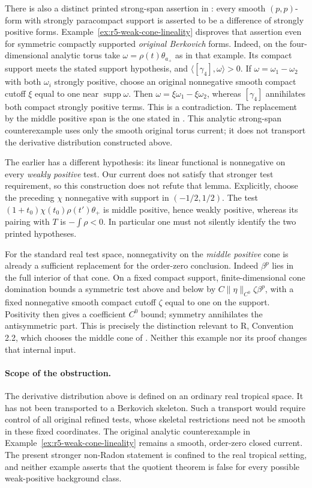 \documentclass[11pt,a4paper]{article}
\numberwithin{equation}{section}
\theoremstyle{definition}
\theoremstyle{remark}
\begin{document}
There is also a distinct printed strong-span assertion in
\cite[Lemma 5.3.3, p.~81]{CLD12}: every smooth $(p,p)$-form
with strongly paracompact support is asserted to be a difference
of strongly positive forms.  Example~\ref{ex:r5-weak-cone-lineality}
disproves that assertion even for symmetric compactly supported
\emph{original Berkovich} forms.  Indeed, on the four-dimensional
analytic torus take $\omega=\rho(t)\theta_{a_+}$ as in that
example.  Its compact support meets the stated support hypothesis,
and $\langle[\gamma_4],\omega\rangle>0$.
If $\omega=\omega_1-\omega_2$ with both $\omega_i$ strongly
positive, choose an original nonnegative smooth compact cutoff
$\xi$ equal to one near $\operatorname{supp}\omega$.
Then $\omega=\xi\omega_1-\xi\omega_2$, whereas
$[\gamma_4]$ annihilates both compact strongly positive terms.
This is a contradiction.  The replacement by the middle
positive span is the one stated in
\cite[Proposition 6.5.2]{CLD25}.  This analytic strong-span
counterexample uses only the smooth original torus current;
it does not transport the derivative distribution constructed
above.

The earlier \cite[Lemma 5.4.4, p.~82]{CLD12} has a different
hypothesis: its linear functional is nonnegative on every
\emph{weakly positive} test.  Our current does not satisfy that
stronger test requirement, so this construction does not refute
that lemma.  Explicitly, choose the preceding $\chi$ nonnegative
with support in $(-1/2,1/2)$.  The test
$(1+t_0)\chi(t_0)\rho(t')\theta_+$ is middle positive, hence
weakly positive, whereas its pairing with $T$ is
$-\int\rho<0$.  In particular one must not silently identify
the two printed hypotheses.

For the standard real test space, nonnegativity on the
\emph{middle positive} cone is already a sufficient replacement
for the order-zero conclusion.  Indeed $\beta^p$ lies in the
full interior of that cone.  On a fixed compact support,
finite-dimensional cone domination bounds a symmetric test
above and below by $C\|\eta\|_{C^0}\zeta\beta^p$, with a fixed
nonnegative smooth compact cutoff $\zeta$ equal to one on the
support.  Positivity then gives a coefficient $C^0$ bound;
symmetry annihilates the antisymmetric part.  This is precisely
the distinction relevant to R, Convention 2.2, which chooses
the middle cone of \cite[Definition 5.1.1(c)]{CLD12}.  Neither
this example nor its proof changes that internal input.

\paragraph{Scope of the obstruction.}
The derivative distribution above is defined on an ordinary real
tropical space.  It has not been transported to a Berkovich
skeleton.  Such a transport would require control of all
original refined tests, whose skeletal restrictions need not be
smooth in these fixed coordinates.  The original analytic
counterexample in Example~\ref{ex:r5-weak-cone-lineality} remains
a smooth, order-zero closed current.  The present stronger
non-Radon statement is confined to the real tropical setting,
and neither example asserts that the quotient theorem is false
for every possible weak-positive background class.
\end{document}
